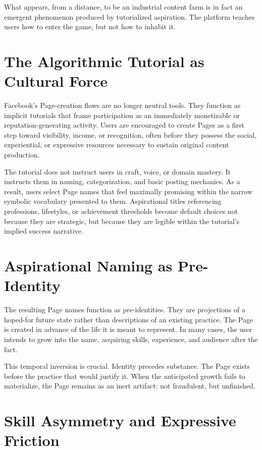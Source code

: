 \documentclass[11pt,oneside]{article}
\begin{document}
What appears, from a distance, to be an industrial content farm is in fact an emergent phenomenon produced by tutorialized aspiration. The platform teaches users how to enter the game, but not how to inhabit it.

\section{The Algorithmic Tutorial as Cultural Force}

Facebook’s Page-creation flows are no longer neutral tools. They function as implicit tutorials that frame participation as an immediately monetizable or reputation-generating activity. Users are encouraged to create Pages as a first step toward visibility, income, or recognition, often before they possess the social, experiential, or expressive resources necessary to sustain original content production.

The tutorial does not instruct users in craft, voice, or domain mastery. It instructs them in naming, categorization, and basic posting mechanics. As a result, users select Page names that feel maximally promising within the narrow symbolic vocabulary presented to them. Aspirational titles referencing professions, lifestyles, or achievement thresholds become default choices not because they are strategic, but because they are legible within the tutorial’s implied success narrative.

\section{Aspirational Naming as Pre-Identity}

The resulting Page names function as pre-identities. They are projections of a hoped-for future state rather than descriptions of an existing practice. The Page is created in advance of the life it is meant to represent. In many cases, the user intends to grow into the name, acquiring skills, experience, and audience after the fact.

This temporal inversion is crucial. Identity precedes substance. The Page exists before the practice that would justify it. When the anticipated growth fails to materialize, the Page remains as an inert artifact: not fraudulent, but unfinished.

\section{Skill Asymmetry and Expressive Friction}
\end{document}
